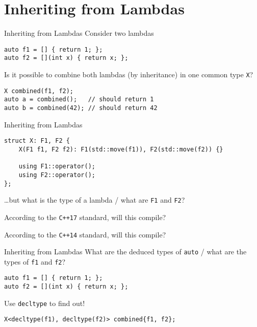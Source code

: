 \begin{frame}
    \centering
    \scalebox{3}{Inheriting from Lambdas}
\end{frame}

\section{Inheriting from Lambdas}

\begin{frame}[fragile]{Inheriting from Lambdas}
    Consider two lambdas
    \begin{lstlisting}
auto f1 = [] { return 1; };
auto f2 = [](int x) { return x; };
    \end{lstlisting}

    Is it possible to combine both lambdas (by inheritance) in one common type \texttt{X}?
    \begin{lstlisting}
X combined(f1, f2);
auto a = combined();   // should return 1
auto b = combined(42); // should return 42
    \end{lstlisting}
\end{frame}

\begin{frame}[fragile]{Inheriting from Lambdas}
    \begin{lstlisting}
struct X: F1, F2 {
    X(F1 f1, F2 f2): F1(std::move(f1)), F2(std::move(f2)) {}

    using F1::operator();
    using F2::operator();
};
    \end{lstlisting}
    \ldots but what is the type of a lambda / what are \texttt{F1} and \texttt{F2}?
\end{frame}

\begin{frame}[fragile]{According to the \texttt{C++17} standard, will this compile?}
\end{frame}

\begin{frame}[fragile]{According to the \texttt{C++14} standard, will this compile?}

\end{frame}

\begin{frame}[fragile]{Inheriting from Lambdas}
    What are the deduced types of \texttt{auto} / what are the types of \texttt{f1} and \texttt{f2}?
    \begin{lstlisting}
auto f1 = [] { return 1; };
auto f2 = [](int x) { return x; };
    \end{lstlisting}
    Use \texttt{decltype} to find out!
    \begin{lstlisting}
X<decltype(f1), decltype(f2)> combined{f1, f2};
    \end{lstlisting}
\end{frame}

